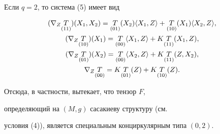 \begin{exam}


Если $q = 2$, то система (5) имеет вид


\begin{gather*}


(\nabla_{Z} \underset{(11)}{T}{}) (X_{1},X_{2}) =


\underset{(01)} {T}{} (X_{2}) \la X_{1}, Z \ra


+ \underset{(10)}{T}{} (X_{1})\la X_{2}, Z \ra, \\


%


(\nabla_{Z} \underset{(10)} {T}{}) (X_{1}) =


\underset{(00)} {T}{}\la X_{1}, Z \ra + K\underset{(11)} {T}{} (X_{1}, Z),\\


%


(\nabla_{Z} \underset{(01)}{T}{}) (X_{2}) =


\underset{(00)}{T}{}\la X_{2}, Z \ra


+ K\underset{(11)}{T}{} (Z, X_{2}), \\


%


\nabla_{Z} \underset{(00)} {T}{}=


K\underset{(01)}{T}{} (Z) + K\underset{(10)} {T}{} (Z).


\end{gather*}


\end{exam}





Отсюда, в частности, вытекает, что тензор $F$, 


определяющий на $(M, g)$ сасакиеву структуру (см. 


условия (4)), является специальным конциркулярным типа $(0,2)$.






